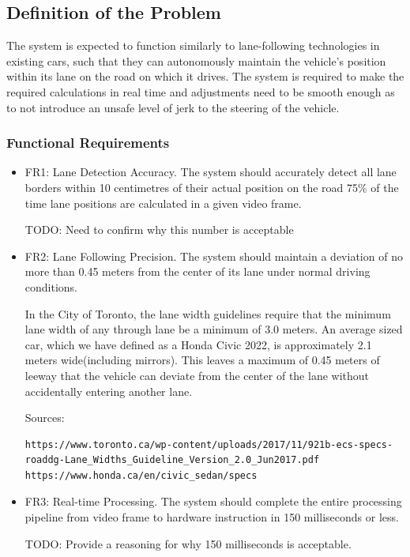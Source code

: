 \documentclass[titlepage]{article}
\begin{document}
\subsection{Definition of the Problem}
The system is expected to function similarly to lane-following technologies in existing cars, such that they can autonomously maintain the vehicle’s position within its lane on the road on which it drives. The system is required to make the required calculations in real time and adjustments need to be smooth enough as to not introduce an unsafe level of jerk to the steering of the vehicle. 


\subsubsection{Functional Requirements}
\begin{itemize}
	\item  FR1: Lane Detection Accuracy. The system should accurately detect all lane borders within 10 centimetres of their actual position on the road 75\% of the time lane positions are calculated in a given video frame. 

TODO: Need to confirm why this number is acceptable

	\item FR2: Lane Following Precision. The system should maintain a deviation of no more than 0.45 meters from the center of its lane under normal driving conditions.

In the City of Toronto, the lane width guidelines require that the minimum lane width of any through lane be a minimum of 3.0 meters. An average sized car, which we have defined as a Honda Civic 2022, is approximately 2.1 meters wide(including mirrors). This leaves a maximum of 0.45 meters of leeway that the vehicle can deviate from the center of the lane without accidentally entering another lane.

Sources:

\begin{verbatim}
https://www.toronto.ca/wp-content/uploads/2017/11/921b-ecs-specs-roaddg-Lane_Widths_Guideline_Version_2.0_Jun2017.pdf
https://www.honda.ca/en/civic_sedan/specs
\end{verbatim}


	\item FR3: Real-time Processing.
The system should complete the entire processing pipeline from video frame to hardware instruction in 150 milliseconds or less.

TODO: Provide a reasoning for why 150 milliseconds is acceptable.



\end{itemize}
\end{document}
